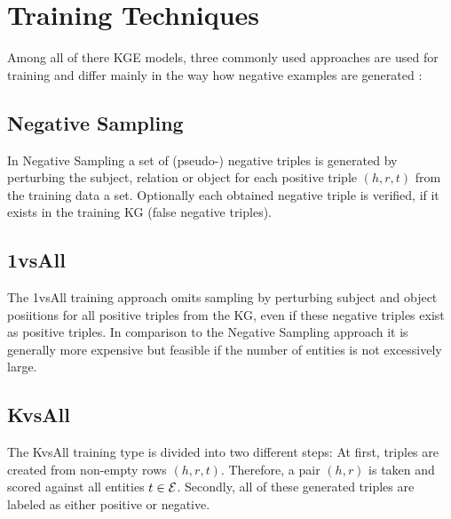 \section{Training Techniques}
\label{sec:training_techniques}

Among all of there \ac{KGE} models, three commonly used approaches are used for training and differ mainly in the way how negative examples are generated \cite{Ruffinelli2020You}:

\subsection{Negative Sampling}
In Negative Sampling a set of (pseudo-) negative triples is generated by perturbing the subject, relation or object for each positive triple $(h, r, t)$ from the training data a set.
Optionally each obtained negative triple is verified, if it exists in the training \ac{KG} (false negative triples).




\subsection{1vsAll}
The 1vsAll training approach omits sampling by perturbing subject and object posiitions for all positive triples from the \ac{KG}, even if these negative triples exist as positive triples.
In comparison to the Negative Sampling approach it is generally more expensive but feasible if the number of entities is not excessively large.
    
\subsection{KvsAll}
The KvsAll training type is divided into two different steps:
At first, triples are created from non-empty rows $(h,r,t)$.
Therefore, a pair $(h,r)$ is taken and scored against all entities $t \in \mathcal{E}$.
Secondly, all of these generated triples are labeled as either positive or negative.